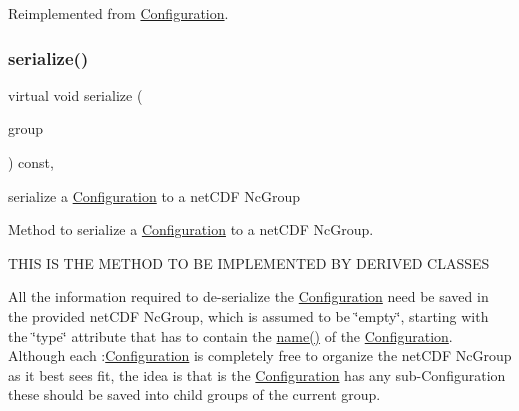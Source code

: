 Reimplemented from \mbox{\hyperlink{class_s_m_spp__di__unipi__it_1_1_configuration_a76975f9a636fcf85b4ed642b58422aaf}{Configuration}}.

\mbox{\label{class_s_m_spp__di__unipi__it_1_1_block_config_a8a626d908100f4419905d89f771150aa}} 
\subsubsection{\texorpdfstring{serialize()}{serialize()}\hspace{0.1cm}{\footnotesize\ttfamily [2/2]}}
{\footnotesize\ttfamily virtual void serialize (\begin{DoxyParamCaption}\item[{net\+C\+D\+F\+::\+Nc\+Group \&\&}]{group }\end{DoxyParamCaption}) const\hspace{0.3cm}{\ttfamily [override]}, {\ttfamily [virtual]}}



serialize a \mbox{\hyperlink{class_s_m_spp__di__unipi__it_1_1_configuration}{Configuration}} to a net\+C\+DF Nc\+Group 

Method to serialize a \mbox{\hyperlink{class_s_m_spp__di__unipi__it_1_1_configuration}{Configuration}} to a net\+C\+DF Nc\+Group. \begin{DoxyVerb}THIS IS THE METHOD TO BE IMPLEMENTED BY DERIVED CLASSES
\end{DoxyVerb}


All the information required to de-\/serialize the \mbox{\hyperlink{class_s_m_spp__di__unipi__it_1_1_configuration}{Configuration}} need be saved in the provided net\+C\+DF Nc\+Group, which is assumed to be \char`\"{}empty\char`\"{}, starting with the \char`\"{}type\char`\"{} attribute that has to contain the \mbox{\hyperlink{class_s_m_spp__di__unipi__it_1_1_configuration_a738e9dfd6e00507da219e4bd5a3f6be9}{name()}} of the \mbox{\hyperlink{class_s_m_spp__di__unipi__it_1_1_configuration}{Configuration}}. Although each \+:\mbox{\hyperlink{class_s_m_spp__di__unipi__it_1_1_configuration}{Configuration}} is completely free to organize the net\+C\+DF Nc\+Group as it best sees fit, the idea is that is the \mbox{\hyperlink{class_s_m_spp__di__unipi__it_1_1_configuration}{Configuration}} has any sub-\/\+Configuration these should be saved into child groups of the current group.

